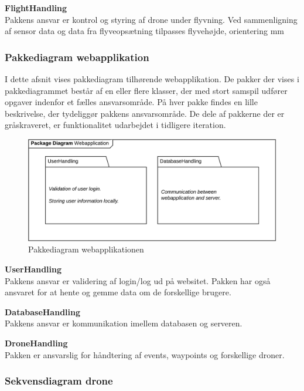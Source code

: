 \textbf{FlightHandling}\\
Pakkens ansvar er kontrol og styring af drone under flyvning. Ved sammenligning af sensor data og data fra flyveopsætning tilpasses flyvehøjde, orientering mm



\newpage
\subsubsection*{Pakkediagram webapplikation}

I dette afsnit vises pakkediagram tilhørende webapplikation. De pakker der vises i pakkediagrammet består af en eller flere klasser, der med stort samspil udfører opgaver indenfor et fælles ansvarsområde. På hver pakke findes en lille beskrivelse, der tydeliggør pakkens ansvarsområde. De dele af pakkerne der er gråskraveret, er funktionalitet udarbejdet i tidligere iteration.

\begin{figure}[H]
	\centering
	\includegraphics[width=1\textwidth]{Billeder/pakke_diagrammer/iteration1_server.png}
	\vspace{-0.5cm}
	\caption{Pakkediagram webapplikationen}
	\label{fig:iteration1_pakke_diagram_webapp}
\end{figure}

\textbf{UserHandling}\\
Pakkens ansvar er validering af login/log ud på websitet. Pakken har også ansvaret for at hente og gemme data om de forskellige brugere.

\textbf{DatabaseHandling}\\
Pakkens ansvar er kommunikation imellem databasen og serveren. 

\textbf{DroneHandling}\\
Pakken er ansvarslig for håndtering af events, waypoints og forskellige droner.

\newpage

\subsubsection*{Sekvensdiagram drone}

